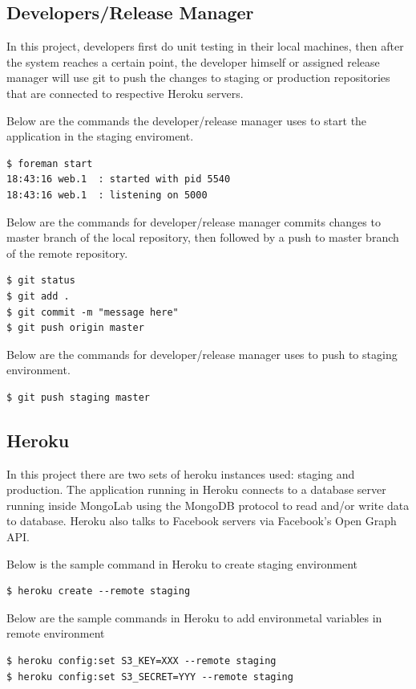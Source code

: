 \subsection{Developers/Release Manager}
In this project, developers first do unit testing in their local machines, then after the system reaches a certain point, the developer himself or assigned release manager will use git to push the changes to staging or production repositories that are connected to respective Heroku servers. 

Below are the commands the developer/release manager uses to start the application in the staging enviroment.
\begin{lstlisting}
$ foreman start
18:43:16 web.1  : started with pid 5540
18:43:16 web.1  : listening on 5000
\end{lstlisting}

Below are the commands for developer/release manager commits changes to master branch of the local repository, then followed by a push to master branch of the remote repository.
\begin{lstlisting}
$ git status
$ git add .
$ git commit -m "message here"
$ git push origin master
\end{lstlisting}

Below are the commands for developer/release manager uses to push to staging environment.
\begin{lstlisting}
$ git push staging master
\end{lstlisting}


\subsection{Heroku}
In this project there are two sets of heroku instances used: staging and production. 
The application running in Heroku connects to a database server running inside MongoLab using the MongoDB protocol to read and/or write data to database.  Heroku also talks to Facebook servers via Facebook's Open Graph API.

Below is the sample command in Heroku to create staging environment
\begin{lstlisting}
$ heroku create --remote staging
\end{lstlisting}

Below are the sample commands in Heroku to add environmetal variables in remote environment
\begin{lstlisting}
$ heroku config:set S3_KEY=XXX --remote staging
$ heroku config:set S3_SECRET=YYY --remote staging
\end{lstlisting}

